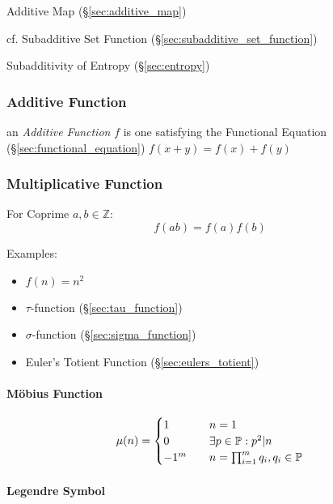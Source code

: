 Additive Map (\S\ref{sec:additive_map})

cf. Subadditive Set Function (\S\ref{sec:subadditive_set_function})

Subadditivity of Entropy (\S\ref{sec:entropy})



\subsubsection{Additive Function}\label{sec:additive_function}

an \emph{Additive Function} $f$ is one satisfying the Functional Equation
(\S\ref{sec:functional_equation}) $f(x+y) = f(x) + f(y)$



\subsubsection{Multiplicative Function}
\label{sec:multiplicative_function}

For Coprime $a,b \in \mathbb{Z}$:
\[
  f(ab) = f(a)f(b)
\]

Examples:
\begin{itemize}
  \item $f(n) = n^2$
  \item $\tau$-function (\S\ref{sec:tau_function})
  \item $\sigma$-function (\S\ref{sec:sigma_function})
  \item Euler's Totient Function (\S\ref{sec:eulers_totient})
\end{itemize}



\paragraph{M\"obius Function}\label{sec:mobius_function}\hfill

\[
  \mu(n) =
  \begin{cases}
  1     & \quad n = 1 \\
  0     & \quad \exists p \in \mathbb{P} : p^2|n \\
  -1^m  & \quad n = \prod_{i = 1}^m q_i, q_i \in \mathbb{P} \\
  \end{cases}
\]



\paragraph{Legendre Symbol}\label{sec:legendre_symbol}\hfill

